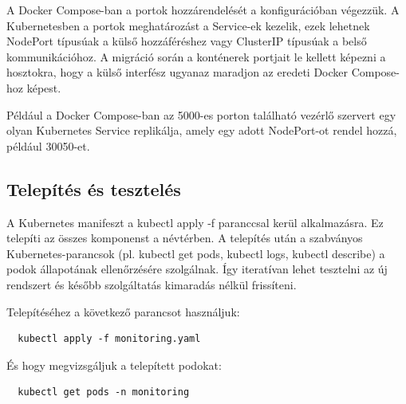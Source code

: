 A Docker Compose-ban a portok hozzárendelését a konfigurációban végezzük. 
A Kubernetesben a portok meghatározást a Service-ek kezelik, ezek lehetnek 
NodePort típusúak a külső hozzáféréshez vagy ClusterIP típusúak a belső kommunikációhoz. 
A migráció során a konténerek portjait le kellett képezni a hosztokra, hogy a külső interfész 
ugyanaz maradjon az eredeti Docker Compose-hoz képest.

Például a Docker Compose-ban az 5000-es porton található vezérlő szervert egy olyan Kubernetes Service replikálja, 
amely egy adott NodePort-ot rendel hozzá, például 30050-et.

\subsection{Telepítés és tesztelés}

A Kubernetes manifeszt a kubectl apply -f paranccsal kerül alkalmazásra. Ez telepíti az összes komponenst a névtérben. 
A telepítés után a szabványos Kubernetes-parancsok (pl. kubectl get pods, kubectl logs, kubectl describe) 
a podok állapotának ellenőrzésére szolgálnak. Így iteratívan lehet tesztelni az új rendszert és később 
szolgáltatás kimaradás nélkül frissíteni.

Telepítéséhez a következő parancsot használjuk:

\begin{lstlisting}
  kubectl apply -f monitoring.yaml
\end{lstlisting}

És hogy megvizsgáljuk a telepített podokat:

\begin{lstlisting}
  kubectl get pods -n monitoring
\end{lstlisting}
